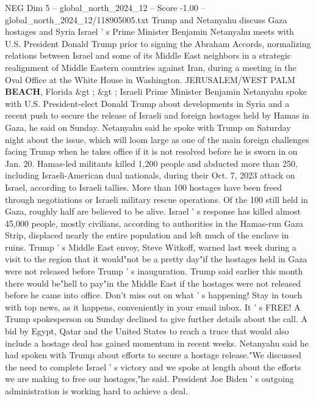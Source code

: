 \begin{textsample}{NEG Dim 5 – global\_north\_2024\_12 – Score -1.00 – global\_north\_2024\_12/118905005.txt}  \label{ex:f5_neg_334}
Trump and Netanyahu discuss Gaza hostages and Syria Israel ' s Prime Minister Benjamin Netanyahu meets with U.S.
President Donald Trump prior to signing the Abraham Accords, normalizing relations between Israel and some of its Middle East neighbors in a strategic realignment of Middle Eastern countries against Iran, during a meeting in the Oval Office at the White House in Washington.
JERUSALEM/WEST PALM \textbf{BEACH}, Florida \&gt ; \&gt ; Israeli Prime Minister Benjamin Netanyahu spoke with U.S.
President-elect Donald Trump about developments in Syria and a recent push to secure the release of Israeli and foreign hostages held by Hamas in Gaza, he said on Sunday.
Netanyahu said he spoke with Trump on Saturday night about the issue, which will loom large as one of the main foreign challenges facing Trump when he takes office if it is not resolved before he is sworn in on Jan. 20.
Hamas-led militants killed 1,200 people and abducted more than 250, including Israeli-American dual nationals, during their Oct. 7, 2023 attack on Israel, according to Israeli tallies.
More than 100 hostages have been freed through negotiations or Israeli military rescue operations.
Of the 100 still held in Gaza, roughly half are believed to be alive.
Israel ' s response has killed almost 45,000 people, mostly civilians, according to authorities in the Hamas-run Gaza Strip, displaced nearly the entire population and left much of the enclave in ruins.
Trump ' s Middle East envoy, Steve Witkoff, warned last week during a visit to the region that it would"not be a pretty day"if the hostages held in Gaza were not released before Trump ' s inauguration.
Trump said earlier this month there would be"hell to pay"in the Middle East if the hostages were not released before he came into office.
Don't miss out on what ' s happening!
Stay in touch with top news, as it happens, conveniently in your email inbox.
It ' s FREE!
A Trump spokesperson on Sunday declined to give further details about the call.
A bid by Egypt, Qatar and the United States to reach a truce that would also include a hostage deal has gained momentum in recent weeks.
Netanyahu said he had spoken with Trump about efforts to secure a hostage release."We discussed the need to complete Israel ' s victory and we spoke at length about the efforts we are making to free our hostages,"he said.
President Joe Biden ' s outgoing administration is working hard to achieve a deal.

\end{textsample}
